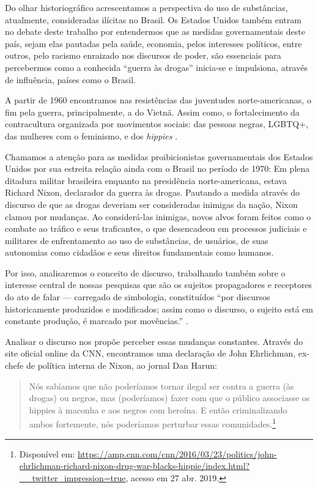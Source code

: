 \begin{refsection}
    Do olhar historiográfico acrescentamos a perspectiva do uso de substâncias, atualmente, consideradas ilícitas no Brasil. Os Estados Unidos também entram no debate deste trabalho por entendermos que as medidas governamentais deste país, sejam elas pautadas pela saúde, economia, pelos interesses políticos, entre outros, pelo racismo enraizado nos discursos de poder, são essenciais para percebermos como a conhecida ``guerra às drogas'' inicia-se e impulsiona, através de influência, países como o Brasil.

    A partir de 1960 encontramos nas resistências das juventudes norte-americanas, o fim pela guerra, principalmente, a do Vietnã. Assim como, o fortalecimento da contracultura organizada por movimentos sociais: das pessoas negras, LGBTQ+, das mulheres com o feminismo, e dos \textit{hippies} \cite{Grant2014Historia}.

    Chamamos a atenção para as medidas proibicionistas governamentais dos Estados Unidos por sua estreita relação ainda com o Brasil no período de 1970: Em plena ditadura militar brasileira enquanto na presidência norte-americana, estava Richard Nixon, declarador da guerra às drogas. Pautando a medida através do discurso de que as drogas deveriam ser consideradas inimigas da nação, Nixon clamou por mudanças. Ao considerá-las inimigas, novos alvos foram feitos como o combate ao tráfico e seus traficantes, o que desencadeou em processos judiciais e militares de enfrentamento ao uso de substâncias, de usuários, de suas autonomias como cidadãos e seus direitos fundamentais como humanos.  

    Por isso, analisaremos o conceito de discurso, trabalhando também sobre o interesse central de nossas pesquisas que são os sujeitos propagadores e receptores do ato de falar --- carregado de simbologia, constituídos ``por discursos historicamente produzidos e modificados; assim como o discurso, o sujeito está em constante produção, é marcado por movências.'' \cite[p.~16]{Fernandes2012Discurso}.

    Analisar o discurso nos propõe perceber essas mudanças constantes. Através do site oficial online da CNN, encontramos uma declaração de John Ehrlichman, ex-chefe de política interna de Nixon, ao jornal Dan Harun:

    \begin{quotation}
        Nós sabíamos que não poderíamos tornar ilegal ser contra a guerra (às drogas) ou negros, mas (poderíamos) fazer com que o público associasse os hippies à maconha e aos negros com heroína. E então criminalizando ambos fortemente, nós poderíamos perturbar essas comunidades.\footnote{Disponível em: \url{https://amp.cnn.com/cnn/2016/03/23/politics/john-ehrlichman-richard-nixon-drug-war-blacks-hippie/index.html?__twitter_impression=true}, acesso em 27 abr. 2019.}
    \end{quotation}


\end{refsection}
